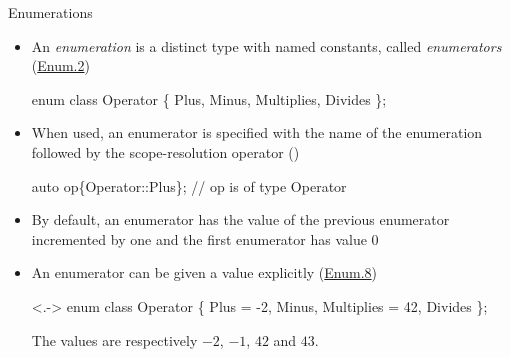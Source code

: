 \begin{frame}[fragile]{Enumerations}

  \begin{itemize}[<+->]
  \item An \textit{enumeration} is a distinct type with named constants, called
    \textit{enumerators} (\href{https://isocpp.github.io/CppCoreGuidelines/CppCoreGuidelines#enum2-use-enumerations-to-represent-sets-of-related-named-constants}{Enum.2})

  \begin{codeblock}
enum class Operator \{ Plus, Minus, Multiplies, Divides \};\end{codeblock}

  \item When used, an enumerator is specified with the name of the enumeration
    followed by the scope-resolution operator (\code{::})

    \begin{codeblock}
auto op\{Operator::Plus\}; // op is of type Operator\end{codeblock}

  \item By default, an enumerator has the value of the previous enumerator
    incremented by one and the first enumerator has value $0$
  \item An enumerator can be given a value explicitly (\href{https://isocpp.github.io/CppCoreGuidelines/CppCoreGuidelines#enum8-specify-enumerator-values-only-when-necessary}{Enum.8})
    \begin{codeblock}<.->{
enum class Operator \{ Plus = -2, Minus, Multiplies = 42, Divides \};}\end{codeblock}
    The values are respectively $-2$, $-1$, $42$ and $43$.

  \end{itemize}
\end{frame}

